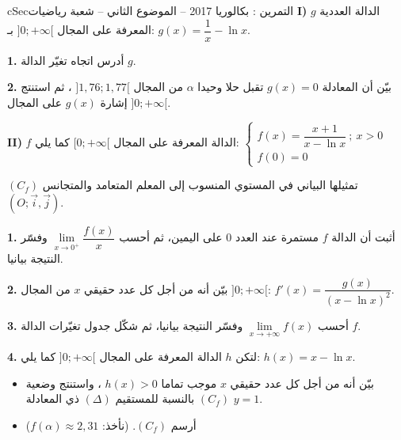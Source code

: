 \documentclass[12pt,a4paper]{article}
\newenvironment{BOX}[2]{\begin{otherlanguage}{english}\begin{arbox}{#1}{#2}}{\end{arbox}\end{otherlanguage}}
\newcounter{exo}
\newenvironment{tamrin}[1]{\stepcounter{exo}\begin{BOX}{cSec}{التمرين \theexo: #1}}{\end{BOX}}
\newenvironment{sq}{\begin{itemize}[leftmargin=2.4em,itemsep=3pt]}{\end{itemize}}
\newcommand{\qa}{\item[(أ)]}\newcommand{\qb}{\item[(ب)]}\newcommand{\qc}{\item[(جـ)]}\newcommand{\qd}{\item[(د)]}\newcommand{\qe}{\item[(هـ)]}
\newcommand{\QQ}[1]{\par\smallskip\textbf{#1.} }
\begin{document}
\begin{tamrin}{بكالوريا 2017 -- الموضوع الثاني -- شعبة رياضيات}
\textbf{I)} $g$ الدالة العددية المعرفة على المجال $]0;+\infty[$ بـ: $g(x)=\dfrac1x-\ln x$.
\QQ{1} أدرس اتجاه تغيّر الدالة $g$.
\QQ{2} بيّن أن المعادلة $g(x)=0$ تقبل حلا وحيدا $\alpha$ من المجال $]1{,}76;1{,}77[$ ، ثم استنتج إشارة $g(x)$ على المجال $]0;+\infty[$.

\textbf{II)} $f$ الدالة المعرفة على المجال $[0;+\infty[$ كما يلي:
$\begin{cases} f(x)=\dfrac{x+1}{x-\ln x}\ ;\ x>0\\[4pt] f(0)=0\end{cases}$

$(C_f)$ تمثيلها البياني في المستوي المنسوب إلى المعلم المتعامد والمتجانس $(O;\vec i,\vec j)$.
\QQ{1} أثبت أن الدالة $f$ مستمرة عند العدد $0$ على اليمين، ثم أحسب $\lim\limits_{x\to0^{+}}\dfrac{f(x)}{x}$ وفسّر النتيجة بيانيا.
\QQ{2} بيّن أنه من أجل كل عدد حقيقي $x$ من المجال $]0;+\infty[$: $f'(x)=\dfrac{g(x)}{(x-\ln x)^2}$.
\QQ{3} أحسب $\lim\limits_{x\to+\infty}f(x)$ وفسّر النتيجة بيانيا، ثم شكّل جدول تغيّرات الدالة $f$.
\QQ{4} لتكن $h$ الدالة المعرفة على المجال $]0;+\infty[$ كما يلي: $h(x)=x-\ln x$.
\begin{sq}
\qa بيّن أنه من أجل كل عدد حقيقي $x$ موجب تماما $h(x)>0$ ، واستنتج وضعية $(C_f)$ بالنسبة للمستقيم $(\Delta)$ ذي المعادلة $y=1$.
\qb أرسم $(C_f)$. (نأخذ: $f(\alpha)\approx2{,}31$)
\end{sq}
\end{tamrin}
\end{document}
